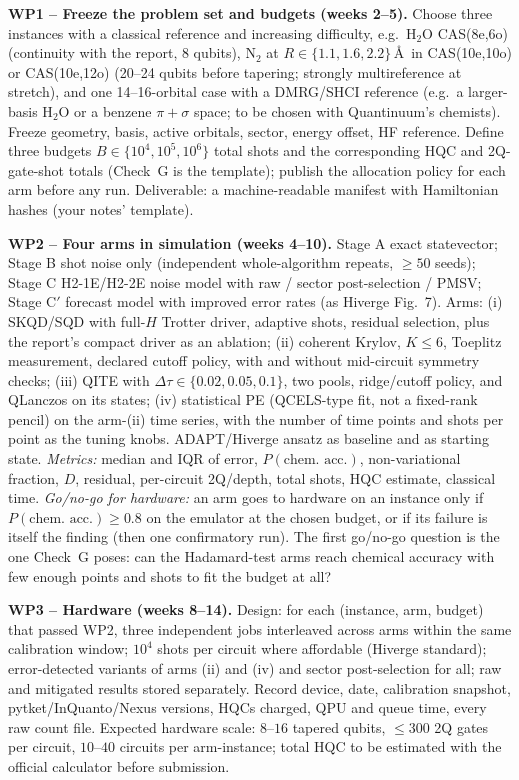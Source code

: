 \documentclass[11pt,a4paper]{article}
\newcommand{\report}{the report}
\begin{document}
\textbf{WP1 -- Freeze the problem set and budgets (weeks 2--5).} Choose three instances with a classical reference and increasing difficulty, e.g.\ H$_2$O CAS(8e,6o) (continuity with \report, 8 qubits), N$_2$ at $R\in\{1.1,1.6,2.2\}$\,\AA\ in CAS(10e,10o) or CAS(10e,12o) (20--24 qubits before tapering; strongly multireference at stretch), and one 14--16-orbital case with a DMRG/SHCI reference (e.g.\ a larger-basis H$_2$O or a benzene $\pi+\sigma$ space; to be chosen with Quantinuum's chemists). Freeze geometry, basis, active orbitals, sector, energy offset, HF reference. Define three budgets $B\in\{10^4,10^5,10^6\}$ total shots and the corresponding HQC and 2Q-gate-shot totals (Check~G is the template); publish the allocation policy for each arm before any run. Deliverable: a machine-readable manifest with Hamiltonian hashes (your notes' template).

\textbf{WP2 -- Four arms in simulation (weeks 4--10).} Stage A exact statevector; Stage B shot noise only (independent whole-algorithm repeats, $\ge50$ seeds); Stage C H2-1E/H2-2E noise model with raw / sector post-selection / PMSV; Stage C$'$ forecast model with improved error rates (as Hiverge Fig.~7). Arms: (i) SKQD/SQD with full-$H$ Trotter driver, adaptive shots, residual selection, plus \report's compact driver as an ablation; (ii) coherent Krylov, $K\le6$, Toeplitz measurement, declared cutoff policy, with and without mid-circuit symmetry checks; (iii) QITE with $\Delta\tau\in\{0.02,0.05,0.1\}$, two pools, ridge/cutoff policy, and QLanczos on its states; (iv) statistical PE (QCELS-type fit, not a fixed-rank pencil) on the arm-(ii) time series, with the number of time points and shots per point as the tuning knobs. ADAPT/Hiverge ansatz as baseline and as starting state. \emph{Metrics:} median and IQR of error, $P(\text{chem.\ acc.})$, non-variational fraction, $D$, residual, per-circuit 2Q/depth, total shots, HQC estimate, classical time. \emph{Go/no-go for hardware:} an arm goes to hardware on an instance only if $P(\text{chem.\ acc.})\ge0.8$ on the emulator at the chosen budget, or if its failure is itself the finding (then one confirmatory run). The first go/no-go question is the one Check~G poses: can the Hadamard-test arms reach chemical accuracy with few enough points and shots to fit the budget at all?

\textbf{WP3 -- Hardware (weeks 8--14).} Design: for each (instance, arm, budget) that passed WP2, three independent jobs interleaved across arms within the same calibration window; $10^4$ shots per circuit where affordable (Hiverge standard); error-detected variants of arms (ii) and (iv) and sector post-selection for all; raw and mitigated results stored separately. Record device, date, calibration snapshot, pytket/InQuanto/Nexus versions, HQCs charged, QPU and queue time, every raw count file. Expected hardware scale: $8$--$16$ tapered qubits, $\le300$ 2Q gates per circuit, $10$--$40$ circuits per arm-instance; total HQC to be estimated with the official calculator before submission.
\end{document}

